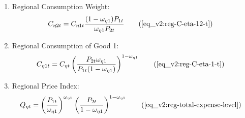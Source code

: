 \documentclass[../thesis.tex]{subfiles}
\begin{document}
{\begin{itemize}
\begin{enumerate}
		\item Regional Consumption Weight:
		\begin{align}
			C_{\eta 2 t} &= C_{\eta 1 t} \frac{(1 - \omega_{\eta 1}) P_{1t}}{\omega_{\eta 1} P_{2t}} \tag{\ref{eq_v2:reg-C-eta-12-t}}
		\end{align}
		
		\item Regional Consumption of Good 1:	
		\begin{align}
			C_{\eta 1 t} &= C_{\eta t} \left( \frac{P_{2t} \omega_{\eta 1}}{P_{1t} (1 - \omega_{\eta 1})} \right)^{1-\omega_{\eta 1}} \tag{\ref{eq_v2:reg-C-eta-1-t}}
		\end{align}
		
		\item Regional Price Index:
		\begin{align}
			Q_{\eta t} &= \left( \frac{P_{1 t}}{\omega_{\eta 1}} \right)^{\omega_{\eta 1}} \left( \frac{P_{2 t}}{1 -\omega_{\eta 1}} \right)^{1 -\omega_{\eta  1}} \tag{\ref{eq_v2:reg-total-expense-level}}
		\end{align}
		
		\begin{comment}
			\item Regional Terms of Trade:
			\begin{align}
				\frac{Q_{1t}}{Q_{2t}} &= \frac{\omega_{21}^{\omega_{21}} (1 -\omega_{21})^{1 -\omega_{21}}}{\omega_{11}^{\omega_{11}} (1 - \omega_{11})^{1 - \omega_{11}}} \tag{\ref{eq_v2:reg-total-expense-level-2}}
			\end{align}
		\end{comment}
		
		

\begin{comment}
	\begin{align}
		C_{\eta t} &= C_{\eta 1 t}^{\omega_{\eta 1}} C_{\eta 2 t}^{1-\omega_{\eta 1}} \tag{\ref{eq_v2:reg-consumption-aggregation}}
	\end{align}

	\begin{align}
		C_{11t} &= C_{12t} \frac{\omega_{11} P_{2t}}{(1 - \omega_{11}) P_{1t}} \tag{\ref{eq_v2:reg-C-eta-12-t}}
	\end{align}

	\item Regional Consumption Weights:
		\begin{align}
			\frac{C_{11t} C_{22t}}{C_{21t} C_{12t}} &= \frac{\omega_{11} (1 - \omega_{21})}{\omega_{21} (1 - \omega_{11})} \tag{\ref{eq_v2:reg-C-12-12-t}}
		\end{align}


\end{comment}
\end{enumerate}
\end{itemize}}
\end{document}
